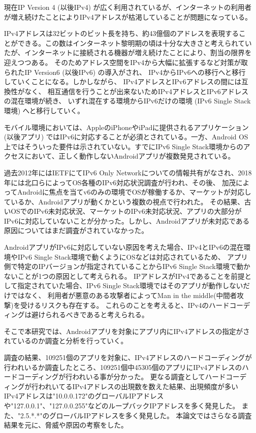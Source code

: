 \documentclass[a4j]{jarticle}
\begin{document}
現在IP Version 4 (以後IPv4) が広く利用されているが、インターネットの利用者が増え続けたことによりIPv4アドレスが枯渇していることが問題になっている。

IPv4アドレスは32ビットのビット長を持ち、約43億個のアドレスを表現することができる。この数はインターネット黎明期の頃は十分な大きさと考えられていたが、インターネットに接続される機器が増え続けたことにより、割当の限界を迎えつつある。
そのためアドレス空間をIPv4から大幅に拡張するなど対策が取られたIP Version6 (以後IPv6) の導入がされ、
IPv4からIPv6への移行へと移行していくことになる。しかしながら、
IPv4アドレスとIPv6アドレスの間には互換性がなく、
相互通信を行うことが出来ないためIPv4アドレスとIPv6アドレスの混在環境が続き、
いずれ混在する環境からIPv6だけの環境 (IPv6 Single Stack環境) へと移行していく。

モバイル環境においては、AppleのiPhoneやiPadに提供されるアプリケーション (以後アプリ) ではIPv6に対応することが必須とされている\cite{one}。一方、Android OS上ではそういった要件は示されていない。すでにIPv6 Single Stack環境からのアクセスにおいて、正しく動作しないAndroidアプリが複数発見されている。

過去2012年にはIETFにてIPv6 Only Networkについての情報共有がなされ\cite{two}、2018年には北口らによってOS各種のIPv6対応状況調査が行われ\cite{three}、その後、
加茂によってAndroidに焦点を当てv6のみの環境でOSが稼働するか、マーケットが対応しているか、Androidアプリが動くかという複数の視点で行われた\cite{four}。
その結果、古いOSでのIPv6未対応状況、マーケットのIPv6未対応状況、アプリの大部分がIPv6に対応していないことが分かった。しかし、Androidアプリが未対応である原因についてはまだ調査がされていなかった。

AndroidアプリがIPv6に対応していない原因を考えた場合、IPv4とIPv6の混在環境やIPv6 Single Stack環境で動くようにOSなどは対応されているため、
アプリ側で特定のIPバージョンが指定されていることからIPv6 Single Stack環境で動かないことが1つの原因として考えられる。
IPアドレスがIPv4であることを前提として指定されていた場合、IPv6 Single Stack環境ではそのアプリが動作しないだけではなく、
利用者が悪意のある攻撃者によってMan in the middle(中間者攻撃)を受けるリスクも存在する。
これらのことを考えると、IPv4のハードコーディングは避けられるべきであると考えられる。

そこで本研究では、Androidアプリを対象にアプリ内にIPv4アドレスの指定がされているのか調査と分析を行っていく。

調査の結果、109251個のアプリを対象に、IPv4アドレスのハードコーディングが行われいるか調査したところ、109251個中45305個のアプリにIPv4アドレスのハードコーディングが行われいる事が分かった。
更なる調査としてハードコーディングが行われいてるIPv4アドレスの出現数を数えた結果、出現頻度が多いIPv4アドレスは"10.0.0.172"のグローバルIPアドレスや"127.0.0.1"、"127.0.0.255"などのループバックIPアドレスを多く発見した。
また、"2.5.*.*"のグローバルIPアドレスを多く発見した。
本論文ではさらなる調査結果を元に、脅威や原因の考察をした。
\end{document}
